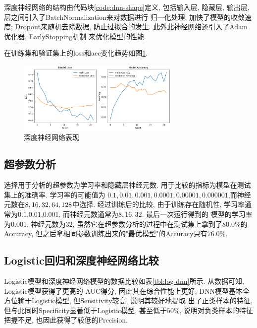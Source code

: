 深度神经网络的结构由代码块\ref{code:dnn-shape}定义, 包括输入层, 隐藏层, 输出层, 层之间引入了BatchNormalization来对数据进行
归一化处理, 加快了模型的收敛速度; Dropout来随机去除数据, 防止过拟合的发生. 此外此神经网络还引入了Adam优化器, EarlyStopping机制
来优化模型的性能.

在训练集和验证集上的loss和acc变化趋势如图\ref{fig:dnn}.



\begin{figure}
    \centering
    \includegraphics[width=0.7\textwidth]{images/output.png}
    \caption{深度神经网络表现}\label{fig:dnn}
\end{figure}

\subsection{超参数分析}

选择用于分析的超参数为学习率和隐藏层神经元数. 用于比较的指标为模型在测试集上的准确率. 学习率的可能值为
$0.1,0.01,0.001,0.0001,0.00001,0.000001$,而神经元数在$8,16,32,\\64,128$中选择. 经过训练后的比较, 
由于训练存在随机性, 学习率通常为$0.1$,$0.01$,$0.001$, 而神经元数通常为$8,16,32$. 最后一次运行得到的
模型的学习率为$0.001$, 神经元数为$32$, 虽然它在超参数分析的过程中在测试集上拿到了$80.0\%$的Accuracy,
但之后拿相同参数训练出来的"最优模型"的Accuracy只有$76.0\%$.

\subsection{Logistic回归和深度神经网络比较}\label{subsection:comparison}

Logistic模型和深度神经网络模型的数据比较如表\ref{tbl:log-dnn}所示. 从数据可知, Logistic模型获得了更高的
AUC得分, 因此其在综合性能上更好; DNN模型基本全方位输于Logistic模型, 但Sensitivity较高, 说明其较好地提取
出了正类样本的特征, 但与此同时Specificity显著低于Logistic模型, 甚至低于$50\%$, 说明对负类样本的特征
把握不足, 也因此获得了较低的Precision.

